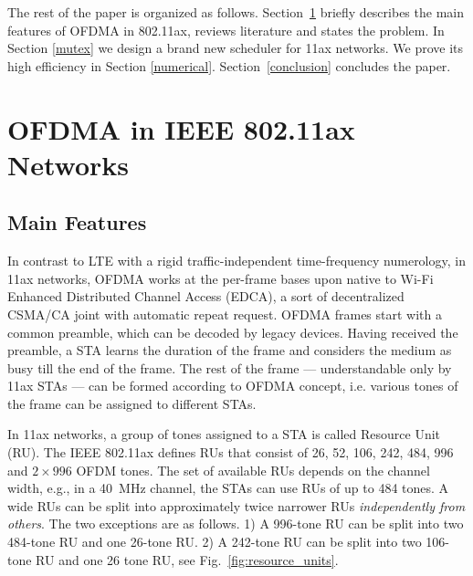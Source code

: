 The rest of the paper is organized as follows.
Section~\ref{sec:ofdma} briefly describes the main features of OFDMA in 802.11ax, reviews literature and states the problem.
In Section \ref{mutex} we design a brand new scheduler for 11ax networks.
We prove its high efficiency in Section \ref{numerical}.
Section~\ref{conclusion} concludes the paper. 



\section{OFDMA in IEEE 802.11ax Networks}
\label{sec:ofdma}
\subsection{Main Features}
\label{mainfeatures}




In contrast to LTE with a rigid traffic-independent time-frequency numerology, in 11ax networks, OFDMA works at the per-frame bases upon native to Wi-Fi Enhanced Distributed Channel Access (EDCA), a sort of decentralized CSMA/CA joint with automatic repeat request. OFDMA frames start with a common preamble, which can be decoded by legacy devices. Having received the preamble, a STA learns the duration of the frame and considers the medium as busy till the end of the frame.
The rest of the frame --- understandable only by 11ax STAs --- can be formed according to OFDMA concept, i.e. various tones of the frame can be assigned to different STAs. 

In 11ax networks, a group of tones assigned to a STA is called Resource Unit (RU).
The IEEE 802.11ax defines RUs that consist of 26, 52, 106, 242, 484, 996 and $2\times996$ OFDM tones.
The set of available RUs depends on the channel width, e.g., in a \SI{40}{\MHz} channel, the STAs can use RUs of up to 484 tones.
A wide RUs can be split into approximately twice narrower RUs \textit{independently from others}. The two exceptions are as follows.
1) A 996-tone RU can be split into two 484-tone RU and one 26-tone RU.
2) A 242-tone RU can be split into two 106-tone RU and one 26 tone RU, see Fig.~\ref{fig:resource_units}.

